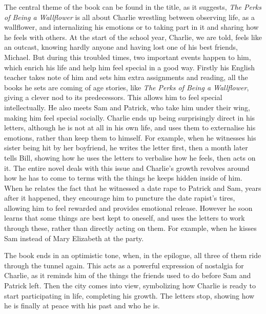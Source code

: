 \documentclass[11pt,a4paper]{report}
\begin{document}
	\begin{multicols}{2}
		
		The central theme of the book can be found in the title, as it suggests, \textit{The Perks of Being a Wallflower} is all about Charlie wrestling between observing life, as a wallflower, and internalizing his emotions or to taking part in it and sharing how he feels with others. At the start of the school year, Charlie, we are told, feels like an outcast, knowing hardly anyone and having lost one of his best friends, Michael. But during this troubled times, two important events happen to him, which enrich his life and help him feel special in a good way. Firstly his English teacher takes note of him and sets him extra assignments and reading, all the books he sets are coming of age stories, like \textit{The Perks of Being a Wallflower}, giving a clever nod to its predecessors. This allows him to feel special intellectually. He also meets Sam and Patrick, who take him under their wing, making him feel special socially. Charlie ends up being surprisingly direct in his letters, although he is not at all in his own life, and uses them to externalise his emotions, rather than keep them to himself. For example, when he witnesses his sister being hit by her boyfriend, he writes the letter first, then a month later tells Bill, showing how he uses the letters to verbalise how he feels, then acts on it. The entire novel deals with this issue and Charlie's growth revolves around how he has to come to terms with the things he keeps hidden inside of him. When he relates the fact that he witnessed a date rape to Patrick and Sam, years after it happened, they encourage him to puncture the date rapist's tires, allowing him to feel rewarded and provides emotional release. However he soon learns that some things are best kept to oneself, and uses the letters to work through these, rather than directly acting on them. For example, when he kisses Sam instead of Mary Elizabeth at the party.
		
		The book ends in an optimistic tone, when, in the epilogue, all three of them ride through the tunnel again. This acts as a powerful expression of nostalgia for Charlie, as it reminds him of the things the friends used to do before Sam and Patrick left. Then the city comes into view, symbolizing how Charlie is ready to start participating in life, completing his growth. The letters stop, showing how he is finally at peace with his  past and who he is.
		
	\end{multicols}
	
\end{document}
